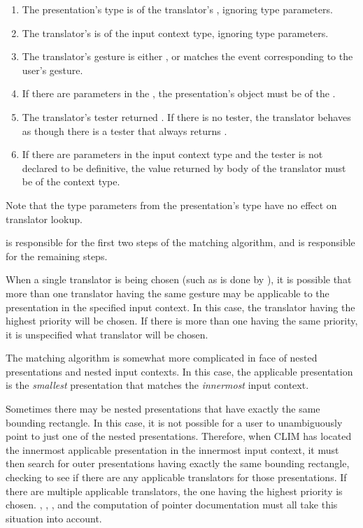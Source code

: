 \begin{enumerate}
\item The presentation's type is  of the translator's
, ignoring type parameters.

\item The translator's  is  of the input
context type, ignoring type parameters.

\item The translator's gesture is either , or matches the event
corresponding to the user's gesture.

\item If there are parameters in the , the presentation's object
must be  of the .

\item The translator's tester returned .  If there is no tester, the
translator behaves as though there is a tester that always returns .

\item If there are parameters in the input context type and the tester is not
declared to be definitive, the value returned by body of the translator must be
 of the context type.
\end{enumerate}

Note that the type parameters from the presentation's type have no effect on
translator lookup.

 is responsible for the first two steps of the
matching algorithm, and  is responsible for the
remaining steps.

When a single translator is being chosen (such as is done by
), it is possible that more than one
translator having the same gesture may be applicable to the presentation in the
specified input context.  In this case, the translator having the highest
priority will be chosen.  If there is more than one having the same priority, it
is unspecified what translator will be chosen.

The matching algorithm is somewhat more complicated in face of nested
presentations and nested input contexts.  In this case, the applicable
presentation is the {\sl smallest} presentation that matches the {\sl innermost}
input context.

Sometimes there may be nested presentations that have exactly the same bounding
rectangle.  In this case, it is not possible for a user to unambiguously point
to just one of the nested presentations.  Therefore, when CLIM has located the
innermost applicable presentation in the innermost input context, it must then
search for outer presentations having exactly the same bounding rectangle,
checking to see if there are any applicable translators for those presentations.
If there are multiple applicable translators, the one having the highest
priority is chosen.  ,
, , and the
computation of pointer documentation must all take this situation into account.


